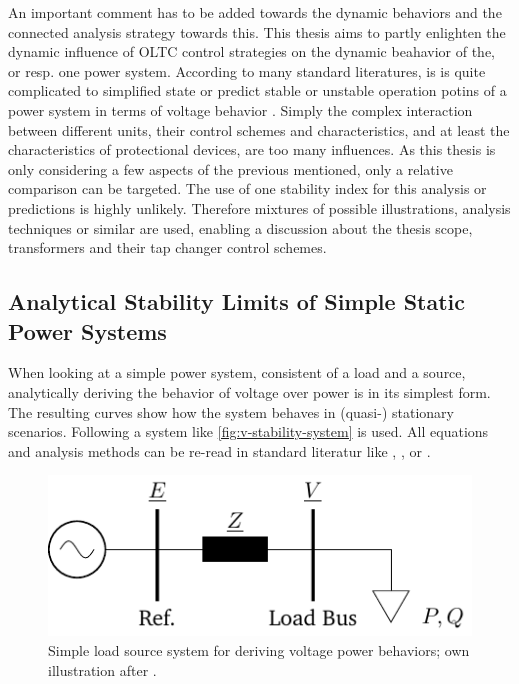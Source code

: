 An important comment has to be added towards the dynamic behaviors and the connected analysis strategy towards this.
This thesis aims to partly enlighten the dynamic influence of \acs{OLTC} control strategies on the dynamic beahavior of the, or resp. one power system.
According to many standard literatures, is is quite complicated to simplified state or predict stable or unstable operation potins of a power system in terms of voltage behavior \autocite{machowski_2020}.
Simply the complex interaction between different units, their control schemes and characteristics, and at least the characteristics of protectional devices, are too many influences.
As this thesis is only considering a few aspects of the previous mentioned, only a relative comparison can be targeted.
The use of one stability index for this analysis or predictions is highly unlikely.
Therefore mixtures of possible illustrations, analysis techniques or similar are used, enabling a discussion about the thesis scope, transformers and their tap changer control schemes.  
        
\subsection{Analytical Stability Limits of Simple Static Power Systems}
\label{sec:analytical-voltage-stability}

When looking at a simple power system, consistent of a load and a source, analytically deriving the behavior of voltage over power is in its simplest form.
The resulting curves show how the system behaves in (quasi-) stationary scenarios.
Following a system like \autoref{fig:v-stability-system} is used. 
All equations and analysis methods can be re-read in standard literatur like \textcite{machowski_2020}, \textcite{kundur_2022}, or \textcite{cutsem_1998}. 

\begin{figure}[htbp!]
    \centering
    \includegraphics{./tikz_graphics/images/analytical_model.pdf}
    \caption[Simple load source system for deriving voltage power behaviors]{Simple load source system for deriving voltage power behaviors; own illustration after \autocite{machowski_2020,kundur_2022,milano_2010}.}
    \label{fig:v-stability-system}
\end{figure}

